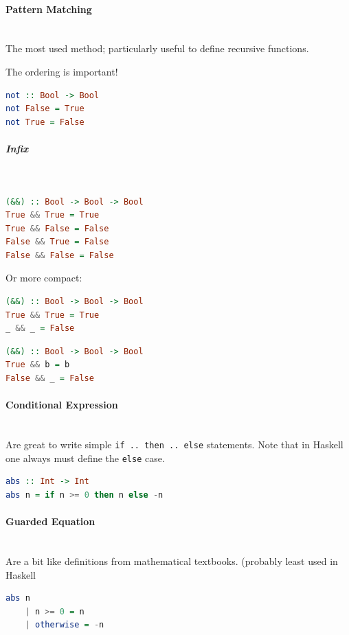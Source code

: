 \paragraph{Pattern Matching} \hfill \\
The most used method; particularly useful to define recursive functions.

The ordering is important!

\begin{lstlisting}[language=Haskell]
not :: Bool -> Bool
not False = True
not True = False
\end{lstlisting}

\subparagraph{Infix} \hfill \\

\begin{lstlisting}[language=Haskell]
(&&) :: Bool -> Bool -> Bool
True && True = True
True && False = False
False && True = False
False && False = False
\end{lstlisting}

Or more compact:
\begin{lstlisting}[language=Haskell]
(&&) :: Bool -> Bool -> Bool
True && True = True
_ && _ = False
\end{lstlisting}

\begin{lstlisting}[language=Haskell]
(&&) :: Bool -> Bool -> Bool
True && b = b
False && _ = False
\end{lstlisting}

\paragraph{Conditional Expression} \hfill \\
Are great to write simple \lstinline|if .. then .. else| statements. Note that in Haskell one always must define the \lstinline|else| case.
\begin{lstlisting}[language=Haskell]
abs :: Int -> Int
abs n = if n >= 0 then n else -n
\end{lstlisting}

\paragraph{Guarded Equation} \hfill \\

Are a bit like definitions from mathematical textbooks. (probably least used in Haskell
\begin{lstlisting}[language=Haskell]
abs n
    | n >= 0 = n
    | otherwise = -n
\end{lstlisting}


